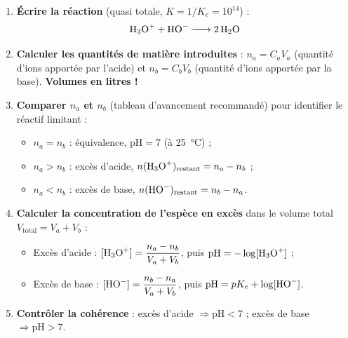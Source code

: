 \documentclass[11pt]{article}
\newcommand{\cle}[1]{{\popxbold\color{popdark}#1}}
\begin{document}
\begin{methode}
\begin{enumerate}
\item \textbf{Écrire la réaction} (quasi totale, $K = 1/K_e = 10^{14}$) :
\[ \ce{H3O+ + HO- -> 2 H2O} \]
\item \textbf{Calculer les quantités de matière introduites} :
$n_a = C_a V_a$ (quantité d'ions  apportée par l'acide) et $n_b = C_b V_b$ (quantité d'ions  apportée par la base). \textbf{Volumes en litres !}
\item \textbf{Comparer $n_a$ et $n_b$} (tableau d'avancement recommandé) pour identifier le réactif limitant :
\begin{itemize}
\item $n_a = n_b$ : \cle{équivalence}, $\text{pH} = 7$ (à \SI{25}{\celsius}) ;
\item $n_a > n_b$ : \cle{excès d'acide}, $n(\ce{H3O+})_{\text{restant}} = n_a - n_b$ ;
\item $n_a < n_b$ : \cle{excès de base}, $n(\ce{HO-})_{\text{restant}} = n_b - n_a$.
\end{itemize}
\item \textbf{Calculer la concentration de l'espèce en excès} dans le volume total $V_{\text{total}} = V_a + V_b$ :
\begin{itemize}
\item Excès d'acide : $[\ce{H3O+}] = \dfrac{n_a - n_b}{V_a + V_b}$, puis $\text{pH} = -\log[\ce{H3O+}]$ ;
\item Excès de base : $[\ce{HO-}] = \dfrac{n_b - n_a}{V_a + V_b}$, puis $\text{pH} = pK_e + \log[\ce{HO-}]$.
\end{itemize}
\item \textbf{Contrôler la cohérence} : excès d'acide $\Rightarrow \text{pH} < 7$ ; excès de base $\Rightarrow \text{pH} > 7$.
\end{enumerate}
\end{methode}
\end{document}
